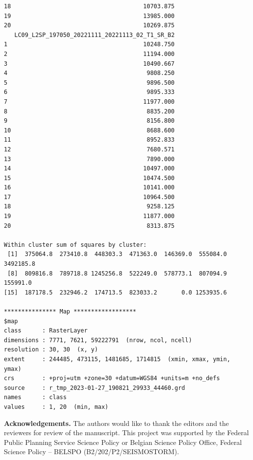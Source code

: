 \documentclass[12pt,a4paper,oneside]{article}
\def \newsection{\vspace{12pt}\textbf}
\begin{document}
\begin{scriptsize}
\begin{verbatim}
18                                      10703.875
19                                      13985.000
20                                      10269.875
   LC09_L2SP_197050_20221111_20221113_02_T1_SR_B2
1                                       10248.750
2                                       11194.000
3                                       10490.667
4                                        9808.250
5                                        9896.500
6                                        9895.333
7                                       11977.000
8                                        8835.200
9                                        8156.800
10                                       8688.600
11                                       8952.833
12                                       7680.571
13                                       7890.000
14                                      10497.000
15                                      10474.500
16                                      10141.000
17                                      10964.500
18                                       9258.125
19                                      11877.000
20                                       8313.875

Within cluster sum of squares by cluster:
 [1]  375064.8  273410.8  448303.3  471363.0  146369.0  555084.0 3492185.8
 [8]  809816.8  789718.8 1245256.8  522249.0  578773.1  807094.9  155991.0
[15]  187178.5  232946.2  174713.5  823033.2       0.0 1253935.6

*************** Map ******************
$map
class      : RasterLayer 
dimensions : 7771, 7621, 59222791  (nrow, ncol, ncell)
resolution : 30, 30  (x, y)
extent     : 244485, 473115, 1481685, 1714815  (xmin, xmax, ymin, ymax)
crs        : +proj=utm +zone=30 +datum=WGS84 +units=m +no_defs 
source     : r_tmp_2023-01-27_190821_29933_44460.grd 
names      : class 
values     : 1, 20  (min, max)
\end{verbatim}
\end{scriptsize}

{\bf Acknowledgements.} The authors would like to thank the editors and the reviewers for review of the manuscript. This project was supported by the Federal Public Planning Service Science Policy or Belgian Science Policy Office, Federal Science Policy -- BELSPO (B2/202/P2/SEISMOSTORM). 

%
%
%


\end{document}
